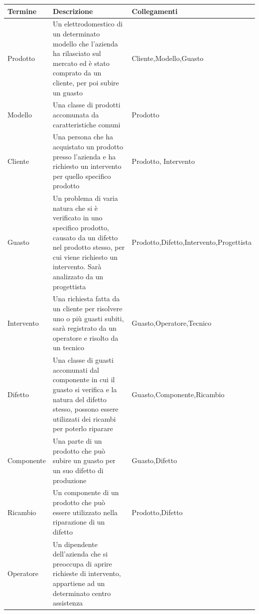 \documentclass[a4paper, 12pt]{report}
\begin{document}
\begin{tabularx}{\linewidth}{>{\hsize=0.375\hsize}X|X|>{\hsize=0.475\hsize}X}
	\hline
	\textbf{Termine} & \textbf{Descrizione} & \textbf{Collegamenti}\\
	\hline
	\hline
	Prodotto & Un elettrodomestico di un determinato modello che l'azienda ha rilasciato sul mercato ed è stato comprato da un cliente, per poi subire un guasto &
	Cliente,\newline Modello,\newline Guasto\\
	\hline
	Modello & Una classe di prodotti accomunata da caratteristiche comuni & Prodotto\\
	\hline
	Cliente & Una persona che ha acquistato un prodotto presso l'azienda e ha richiesto un intervento per quello specifico prodotto & Prodotto,\newline 
	Intervento\\
	\hline
	Guasto & Un problema di varia natura che si è verificato in uno specifico prodotto, causato da un difetto nel prodotto stesso, per cui viene
	richiesto un intervento. Sarà analizzato da un progettista & Prodotto,\newline Difetto,\newline Intervento,\newline Progettista\\
	\hline
	Intervento & Una richiesta fatta da un cliente per risolvere uno o più guasti subiti, sarà registrato da un operatore e risolto da un tecnico
	& Guasto,\newline Operatore,\newline Tecnico\\
	\hline
	Difetto & Una classe di guasti accomunati dal componente in cui il guasto si verifica e la natura del difetto stesso, possono essere utilizzati
	dei ricambi per poterlo riparare & Guasto,\newline Componente,\newline Ricambio\\
	\hline
	Componente & Una parte di un prodotto che può subire un guasto per un suo difetto di produzione & Guasto,\newline Difetto\\
	\hline
	Ricambio & Un componente di un prodotto che può essere utilizzato nella riparazione di un difetto & Prodotto,\newline Difetto\\
	\hline
	Operatore & Un dipendente dell'azienda che si preoccupa di aprire richieste di intervento, appartiene ad un determinato centro assistenza

\end{tabularx}
\end{document}
